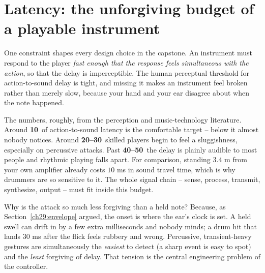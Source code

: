 \section{Latency: the unforgiving budget of a playable instrument}
\label{ch29:latency}

One constraint shapes every design choice in the capstone. An instrument must
respond to the player \emph{fast enough that the response feels simultaneous with the action}, so
that the delay is imperceptible. The human perceptual threshold for action-to-sound delay is
tight, and missing it makes an instrument feel broken rather than merely
slow, because your hand and your ear disagree about when the note happened.

\begin{focusbox}
The numbers, roughly, from the perception and music-technology literature. Around \textbf{10\,} of
action-to-sound latency is the comfortable target -- below it almost nobody notices. Around
\textbf{20--30\,} skilled players begin to feel a sluggishness, especially on percussive
attacks. Past \textbf{40--50\,} the delay is plainly audible to most people and rhythmic playing
falls apart. For comparison, standing $3.4$ m from your own amplifier already costs $10$ ms in sound
travel time, which is why drummers are so sensitive to it. The whole signal chain -- sense, process,
transmit, synthesize, output -- must fit inside this budget.
\end{focusbox}

Why is the attack so much less forgiving than a held note? Because, as Section~\ref{ch29:envelope}
argued, the onset is where the ear's clock is set. A held swell can drift in by a few extra
milliseconds and nobody minds; a drum hit that lands $30$ ms after the flick feels rubbery and wrong.
Percussive, transient-heavy gestures are simultaneously the \emph{easiest} to detect (a sharp event
is easy to spot) and the \emph{least} forgiving of delay. That tension is the central engineering
problem of the controller.

